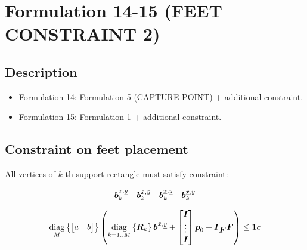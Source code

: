 \section{Formulation 14-15 (FEET CONSTRAINT 2)}


\subsection{Description}
\begin{itemize}
    \item Formulation 14: Formulation 5 (CAPTURE POINT) + additional constraint.
    \item Formulation 15: Formulation 1 + additional constraint.
\end{itemize}



\subsection{Constraint on feet placement}
All vertices of $k$-th support rectangle must satisfy constraint:

\begin{equation*}
    \mbox{\boldmath $b$}^{\bar{x},\underline{y}}_k
    \quad
    \mbox{\boldmath $b$}^{\bar{x},\bar{y}}_k
    \quad
    \mbox{\boldmath $b$}^{\underline{x},\underline{y}}_k
    \quad
    \mbox{\boldmath $b$}^{\underline{x},\bar{y}}_k
\end{equation*}

\begin{equation*}
    \underset{M}{\operatorname{diag}}\left\{\begin{bmatrix} a & b \end{bmatrix}\right\}
    \left(
        \underset{k = 1..M}{\operatorname{diag}}\left\{\mbox{\boldmath $R$}_k\right\}
        \mbox{\boldmath $b$}^{\bar{x},\underline{y}}
        +
        \begin{bmatrix}
            \mbox{\boldmath $I$} \\
            \vdots \\
            \mbox{\boldmath $I$}\\
        \end{bmatrix} 
        \mbox{\boldmath $p$}_0
        +
        \mbox{\boldmath $I$}_{\mbox{\boldmath $F$}}
        \mbox{\boldmath $F$}
    \right)
    \le
    \mbox{\boldmath $1$} c
\end{equation*}


